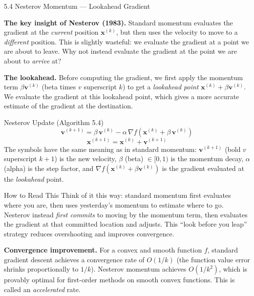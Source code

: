 \documentclass[aspectratio=169,10pt]{beamer}
\newcommand{\vx}{\mathbf{x}}
\newcommand{\vv}{\mathbf{v}}
\begin{document}
\begin{frame}[allowframebreaks]{5.4 Nesterov Momentum --- Lookahead Gradient}

  \textbf{The key insight of Nesterov (1983).}  Standard
  momentum evaluates the gradient at the \emph{current} position
  $\vx^{(k)}$, but then uses the velocity to move to a
  \emph{different} position.  This is slightly wasteful:
  we evaluate the gradient at a point we are about to leave.
  Why not instead evaluate the gradient at the point we are
  about to \emph{arrive} at?

  \vspace{0.5em}
  \textbf{The lookahead.}  Before computing the gradient, we
  first apply the momentum term $\beta\vv^{(k)}$ (beta times
  $v$ superscript $k$) to get a \emph{lookahead point}
  $\vx^{(k)} + \beta\vv^{(k)}$.  We evaluate the gradient at
  this lookahead point, which gives a more accurate estimate
  of the gradient at the destination.

  \begin{block}{Nesterov Update (Algorithm 5.4)}
    \[
      \vv^{(k+1)} = \beta\,\vv^{(k)}
                   - \alpha\,\nabla f\!\left(\vx^{(k)}+\beta\,\vv^{(k)}\right)
    \]
    \[
      \vx^{(k+1)} = \vx^{(k)} + \vv^{(k+1)}
    \]
    The symbols have the same meaning as in standard momentum:
    $\vv^{(k+1)}$ (bold $v$ superscript $k{+}1$) is the new
    velocity, $\beta$ (beta) $\in[0,1)$ is the momentum decay,
    $\alpha$ (alpha) is the step factor, and
    $\nabla f(\vx^{(k)}+\beta\vv^{(k)})$ is the gradient
    evaluated at the \emph{lookahead} point.
  \end{block}

  \begin{alertblock}{How to Read This}
    Think of it this way: standard momentum first evaluates
    where you are, then uses yesterday's momentum to estimate
    where to go.  Nesterov instead \emph{first commits} to
    moving by the momentum term, then evaluates the gradient
    at that committed location and adjusts.  This ``look before
    you leap'' strategy reduces overshooting and improves
    convergence.
  \end{alertblock}

  \framebreak

  \textbf{Convergence improvement.}  For a convex and smooth
  function $f$, standard gradient descent achieves a
  convergence rate of $O(1/k)$ (the function value error shrinks
  proportionally to $1/k$).  Nesterov momentum achieves
  $O(1/k^2)$, which is provably optimal for first-order methods
  on smooth convex functions.  This is called an
  \emph{accelerated} rate.


\end{frame}
\end{document}
